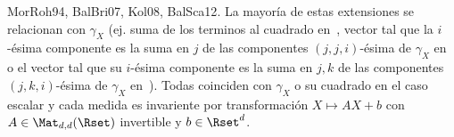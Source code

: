 \begin{itemize}
\begin{enumerate}
{{    MorRoh94, BalBri07, Kol08, BalSca12}.   La mayor\'ia de estas extensiones se
  relacionan   con  $\gamma_X$   (ej.   suma  de   los   terminos  al   cuadrado
  en~\cite{Mar70}, vector tal que la $i$-\'esima componente es la suma en $j$ de
  las componentes $(j,j,i)$-\'esima de $\gamma_X$ en~\cite{MorRho94} o el vector
  tal  que su  $i$-\'esima componente  es la  suma en  $j,k$ de  las componentes
  $(j,k,i)$-\'esima  de   $\gamma_X$  en~\cite{Kol08}).   Todas   coinciden  con
  $\gamma_X$ o  su cuadrado en el caso  escalar y cada medida  es invariente por
  transformaci\'on $X \mapsto A X +  b$ con $A \in \Mat_{d,d}(\Rset)$ invertible y
  $b \in \Rset^d$.}

\end{enumerate}
\end{itemize}
